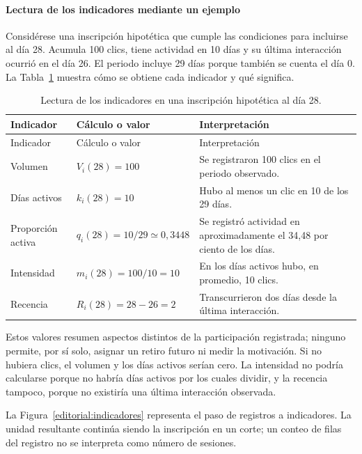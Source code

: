 \paragraph{Lectura de los indicadores mediante un ejemplo}
Considérese una inscripción hipotética que cumple las condiciones para incluirse al día 28. Acumula 100 clics, tiene actividad en 10 días y su última interacción ocurrió en el día 26. El periodo incluye 29 días porque también se cuenta el día 0. La Tabla~\ref{kami:ejemploindicadores} muestra cómo se obtiene cada indicador y qué significa.
\begingroup\small\setlength{\tabcolsep}{4pt}\renewcommand{\arraystretch}{1.16}
\begin{longtable}{p{.23\linewidth}p{.24\linewidth}p{.45\linewidth}}
\caption{Lectura de los indicadores en una inscripción hipotética al día 28.}\label{kami:ejemploindicadores}\\
\toprule Indicador & Cálculo o valor & Interpretación \\\midrule\endfirsthead
\toprule Indicador & Cálculo o valor & Interpretación \\\midrule\endhead
\bottomrule\endfoot
Volumen & $V_i(28)=100$ & Se registraron 100 clics en el periodo observado.\\
Días activos & $k_i(28)=10$ & Hubo al menos un clic en 10 de los 29 días.\\
Proporción activa & $q_i(28)=10/29\simeq0{,}3448$ & Se registró actividad en aproximadamente el 34,48 por ciento de los días.\\
Intensidad & $m_i(28)=100/10=10$ & En los días activos hubo, en promedio, 10 clics.\\
Recencia & $R_i(28)=28-26=2$ & Transcurrieron dos días desde la última interacción.\\
\end{longtable}\endgroup
Estos valores resumen aspectos distintos de la participación registrada; ninguno permite, por sí solo, asignar un retiro futuro ni medir la motivación. Si no hubiera clics, el volumen y los días activos serían cero. La intensidad no podría calcularse porque no habría días activos por los cuales dividir, y la recencia tampoco, porque no existiría una última interacción observada.

La Figura~\ref{editorial:indicadores} representa el paso de registros a indicadores. La unidad resultante continúa siendo la inscripción en un corte; un conteo de filas del registro no se interpreta como número de sesiones.




